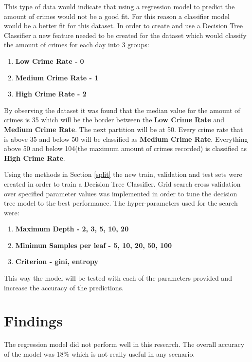 \documentclass[a4paper, twocolumn]{article}
\begin{document}
This type of data would indicate that using a regression model to predict the amount of crimes would not be a good fit.
For this reason a classifier model would be a better fit for this dataset.
In order to create and use a Decision Tree Classifier a new feature needed to be created for the dataset which
would classify the amount of crimes for each day into 3 groups:
\begin{enumerate}
    \item \textbf{Low Crime Rate - 0}
    \item \textbf{Medium Crime Rate - 1}
    \item \textbf{High Crime Rate - 2}
\end{enumerate}
By observing the dataset it was found that the median value for the amount of crimes is 35 which will be the border between the
\textbf{Low Crime Rate} and \textbf{Medium Crime Rate}. The next partition will be at 50. Every crime rate that is above 35 and 
below 50 will be classified as \textbf{Medium Crime Rate}. Everything above 50 and below 104(the maximum amount of crimes recorded)
is classified as \textbf{High Crime Rate}.

Using the methods in Section \ref{split} the new train, validation and test sets were created in order to train a Decision Tree Classifier.
Grid search cross validation over specified parameter values  was implemented in order to tune the decision tree  model to the best performance.
The hyper-parameters used for the search were:
\begin{enumerate}
    \item \textbf{Maximum Depth - 2, 3, 5, 10, 20}
    \item \textbf{Minimun Samples per leaf - 5, 10, 20, 50, 100}
    \item \textbf{Criterion - gini, entropy}
\end{enumerate}

This way the model will be tested with each of the parameters provided and increase the accuracy of the predictions.

\section{Findings}
The regression model did not perform well in this research. The overall accuracy of the model was 18\% which is not
really useful in any scenario.
\end{document}
